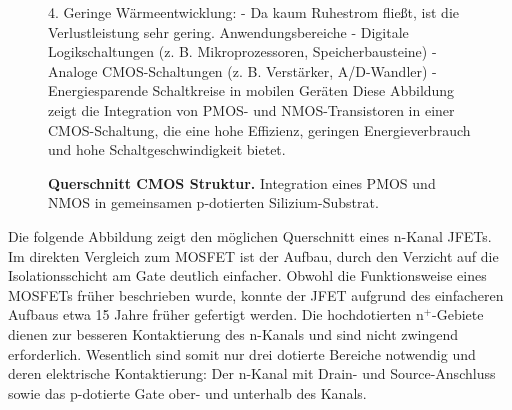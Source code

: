 {\begin{figure}[H]
{            4. Geringe Wärmeentwicklung:
            - Da kaum Ruhestrom fließt, ist die Verlustleistung sehr gering.
            Anwendungsbereiche
            - Digitale Logikschaltungen (z. B. Mikroprozessoren, Speicherbausteine)
            - Analoge CMOS-Schaltungen (z. B. Verstärker, A/D-Wandler)
            - Energiesparende Schaltkreise in mobilen Geräten
            Diese Abbildung zeigt die Integration von PMOS- und NMOS-Transistoren in einer CMOS-Schaltung, die eine hohe Effizienz, geringen Energieverbrauch und hohe Schaltgeschwindigkeit bietet.}
        \caption{\textbf{Querschnitt CMOS Struktur.} Integration eines PMOS und NMOS in gemeinsamen p-dotierten Silizium-Substrat.}
        \label{fig:QuerschnittCMOSStruktur}
    \end{figure}

    Die folgende Abbildung zeigt den möglichen Querschnitt eines n-Kanal JFETs. Im direkten Vergleich
    zum MOSFET ist der Aufbau, durch den Verzicht auf die Isolationsschicht am Gate deutlich einfacher.
    Obwohl die Funktionsweise eines MOSFETs früher beschrieben wurde, konnte der JFET aufgrund des
    einfacheren Aufbaus etwa 15 Jahre früher gefertigt werden. Die hochdotierten $\mathrm{n^+}$-Gebiete dienen zur
    besseren Kontaktierung des n-Kanals und sind nicht zwingend erforderlich. Wesentlich sind somit nur
    drei dotierte Bereiche notwendig und deren elektrische Kontaktierung: Der n-Kanal mit Drain- und
    Source-Anschluss sowie das p-dotierte Gate ober- und unterhalb des Kanals.


}
